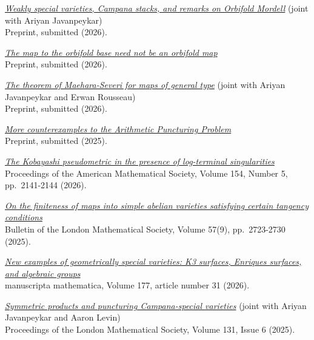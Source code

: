 \documentclass[paper=a4,fontsize=10pt,DIV=12,BCOR=3mm,pdftex]{scrartcl}
\begin{document}
\begin{etaremune}
\item \href{https://arxiv.org/abs/2603.28745}{\textit{Weakly special varieties, Campana stacks, and remarks on Orbifold Mordell}} (joint with Ariyan Javanpeykar) \\
Preprint, submitted (2026).

\item \href{https://arxiv.org/abs/2603.06083}{\textit{The map to the orbifold base need not be an orbifold map}} \\
Preprint, submitted (2026).

\item \href{https://arxiv.org/abs/2602.02314}{\textit{The theorem of Maehara-Severi for maps of general type}} (joint with Ariyan Javanpeykar and Erwan Rousseau) \\
Preprint, submitted (2026).

\item \href{https://arxiv.org/abs/2512.05345}{\textit{More counterexamples to the Arithmetic Puncturing Problem}} \\
Preprint, submitted (2025).

\item \href{https://arxiv.org/abs/2507.01656}{\textit{The Kobayashi pseudometric in the presence of log-terminal singularities}} \\
Proceedings of the American Mathematical Society, Volume 154, Number 5, pp.\ 2141-2144 (2026).

\item \href{https://doi.org/10.1112/blms.70119}{\textit{On the finiteness of maps into simple abelian varieties satisfying certain tangency conditions}} \\
Bulletin of the London Mathematical Society, Volume 57(9), pp.\ 2723-2730 (2025).

\item \href{https://doi.org/10.1007/s00229-026-01709-3}{\textit{New examples of geometrically special varieties: K3 surfaces, Enriques surfaces, and algebraic groups}} \\
manuscripta mathematica, Volume 177, article number 31 (2026).

\item \href{https://doi.org/10.1112/plms.70108}{\textit{Symmetric products and puncturing Campana-special varieties}} (joint with Ariyan Javanpeykar and Aaron Levin) \\
Proceedings of the London Mathematical Society, Volume 131, Issue 6 (2025).


\end{etaremune}
\end{document}
